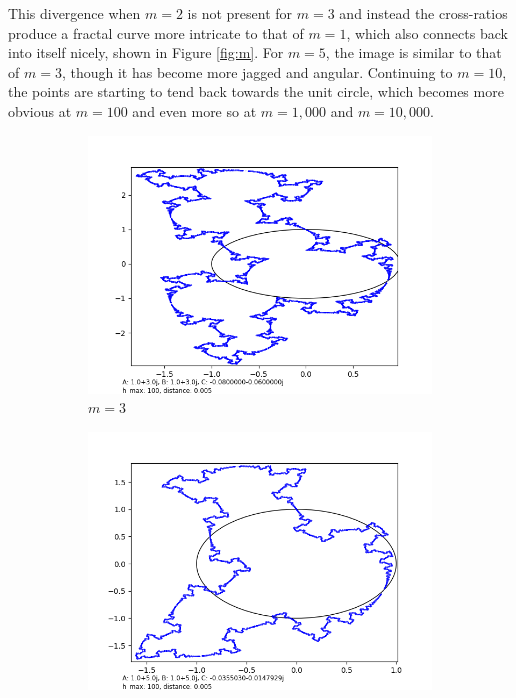 \documentclass[12pt,a4paper,reqno,parskip=full]{amsart}
\numberwithin{equation}{section}
\theoremstyle{plain}
\theoremstyle{definition}
\begin{document}
This divergence when $m=2$ is not present for $m=3$ and instead the cross-ratios produce a fractal curve more intricate to that of $m=1$, which also connects back into itself nicely, shown in Figure \ref{fig:m}. For $m=5$, the image is similar to that of $m=3$, though it has become more jagged and angular. Continuing to $m=10$, the points are starting to tend back towards the unit circle, which becomes more obvious at $m=100$ and even more so at $m=1,000$ and $m=10,000$.

\begin{figure}[H]
     \centering
     
     \begin{subfigure}[b]{0.3\textwidth}
         \centering
         \includegraphics[width=\textwidth]{images/m/a3,b3,h100,d.005.png}
         \caption{$m=3$}
         \label{fig:m3}
     \end{subfigure}
     \hfill
     \begin{subfigure}[b]{0.3\textwidth}
         \centering
         \includegraphics[width=\textwidth]{images/m/a5,b5,h100,d.005.png}

\end{subfigure}
\end{figure}
\end{document}
